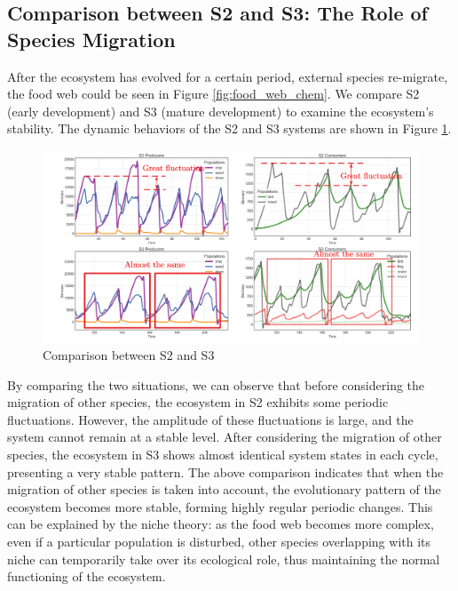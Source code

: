 \documentclass{HZNUMCM}
\begin{document}
      \subsection{Comparison between S2 and S3: The Role of Species Migration}
        After the ecosystem has evolved for a certain period, external species re-migrate, the food web could be seen in Figure \ref{fig:food_web_chem}. 
        We compare S2 (early development) and S3 (mature development) to examine the ecosystem's stability.
        The dynamic behaviors of the S2 and S3 systems are shown in Figure \ref{fig:S2S3}.
        \begin{figure}
          \centering
          \includegraphics[width=\linewidth]{images/S2S3.png}
          \caption{Comparison between S2 and S3}
          \label{fig:S2S3}
        \end{figure}

        By comparing the two situations, we can observe that before considering the migration of other species, 
        the ecosystem in S2 exhibits some periodic fluctuations. However, the amplitude of these fluctuations is large, 
        and the system cannot remain at a stable level. After considering the migration of other species, 
        the ecosystem in S3 shows almost identical system states in each cycle, presenting a very stable pattern. 
        The above comparison indicates that when the migration of other species is taken into account, 
        the evolutionary pattern of the ecosystem becomes more stable, forming highly regular periodic changes. 
        This can be explained by the niche theory: as the food web becomes more complex, 
        even if a particular population is disturbed, 
        other species overlapping with its niche can temporarily take over its ecological role, 
        thus maintaining the normal functioning of the ecosystem.
\end{document}
